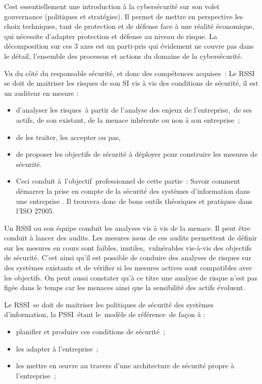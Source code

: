 \begin{nota}
C\ecours est essentiellement une introduction à la cybersécurité sur son volet gouvernance (politiques et stratégies). Il permet de mettre en perspective les choix techniques, tant de protection et de défense face à une réalité économique, qui nécessite d'adapter protection et défense au niveau de risque. La décomposition sur ces 3 axes est un parti-pris qui évidement ne couvre pas dans le détail, l'ensemble des processus et actions du domaine de la cybersécurité. 
\end{nota}

Vu du côté du responsable sécurité, et donc des compétences acquises : Le RSSI se doit de  maitriser les risques de son SI vis à vis des conditions de sécurité, il est un auditeur en mesure : 

\begin{itemize}
  \item d'analyser les risques à partir de l'analyse des enjeux de l'entreprise, de ses actifs, de son existant, de la menace inhérente ou non à son entreprise ;
  \item de les traiter, les accepter ou pas, 
  \item de proposer les objectifs de sécurité à déployer pour construire les mesures de sécurité.
  \item Ceci conduit à l'objectif professionnel de cette partie :  Savoir comment démarrer la prise en compte de la sécurité des systèmes d'information dans une entreprise .  Il trouvera donc de bons outils théoriques et pratiques dans l'ISO 27005.
\end{itemize}


\begin{nota}
Un RSSI ou son équipe conduit les analyses vis à vis de la menace. Il peut être conduit à lancer des audits.  Les mesures issus de ces audits permettent de définir sur les mesures en cours sont faibles, inutiles, vulnérables vis-à-vis des objectifs de sécurité. C'est ainsi qu'il est possible de conduire des analyses de risques sur des systèmes existants et de vérifier si les mesures actives sont compatibles avec les objectifs. On peut aussi constater qu'à ce titre une analyse de risque n'est pas figée dans le temps car les menaces ainsi que la sensibilité des actifs évoluent.
\end{nota}


Le RSSI se doit de maitriser les politiques de sécurité des systèmes d'information,  la PSSI étant le modèle de référence de façon à :
\begin{itemize}
\item planifier et produire ces conditions de sécurité ;
\item les adapter à l'entreprise ;
\item les mettre en œuvre au travers d'une architecture de sécurité propre à l'entreprise ;
\end{itemize}

